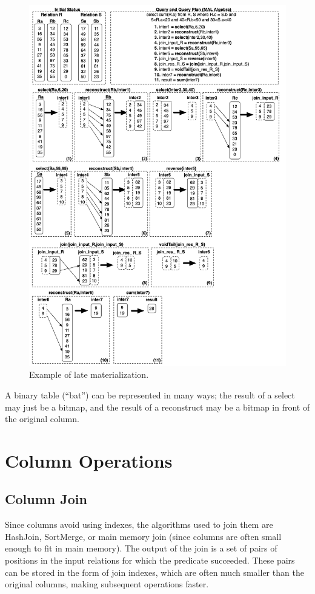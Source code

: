 \begin{figure}[h]
    \centering
    \includegraphics[width=0.75\linewidth]{img/late_materialization.png}
    \caption{Example of late materialization.}
    \label{fig:late-materialization}
\end{figure}

A binary table (``bat'') can be represented in many ways; the result of a select may just be a bitmap, and the result of a reconstruct may be a bitmap in front of the original column.

\section{Column Operations}

\subsection{Column Join}

Since columns avoid using indexes, the algorithms used to join them are HashJoin, SortMerge, or main memory join (since columns are often small enough to fit in main memory). The output of the join is a set of pairs of positions in the input relations for which the predicate succeeded. These pairs can be stored in the form of join indexes, which are often much smaller than the original columns, making subsequent operations faster.

